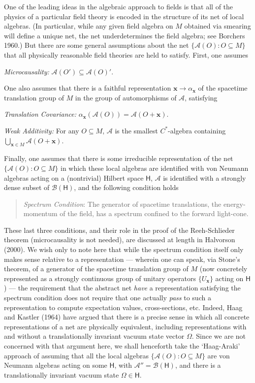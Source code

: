 \documentclass[12pt]{article}
\newcommand{\alg}[1]{\mbox{$\mathcal{#1}$}}
\newcommand{\hil}[1]{\mbox{$\mathsf{#1}$}}
\begin{document}
  One of the leading ideas in the algebraic approach to fields is that 
  all of the 
  physics of a particular field theory is encoded in the structure of 
  its net of local algebras.  (In particular, while any given field 
  algebra on $M$ obtained via smearing will define 
  a unique net, the net underdetermines the field algebra; see 
  Borchers 1960.) 
  But there are some
   general assumptions about the net $\{\alg{A}(O):O\subseteq M\}$ 
  that all physically reasonable 
  field theories are held
   to satisfy.  
  First, one assumes    
    \begin{center} 
\emph{Microcausality:}  $\alg{A}(O')\subseteq \alg{A}(O)'$.   
\end{center}
One also assumes
 that there is a
faithful representation $\mathbf{x}\rightarrow \alpha _{\mathbf{x}}$ of
the spacetime translation group of
$M$ in the group of automorphisms of $\alg{A}$, satisfying 
\begin{center} 
\emph{Translation Covariance:}  $\alpha
_{\mathbf{x}}(\alg{A}(O))=\alg{A}(O+\mathbf{x})$.
\end{center}
\begin{center}  
\emph{Weak Additivity:} For any $O\subseteq M$, $\alg{A}$ is the
smallest
$C^{*}$-algebra containing $\bigcup _{\mathbf{x}\in M}\alg{A}(O+\mathbf{x})$.
\end{center}
Finally, one assumes that there is some irreducible representation of the net 
$\{\alg{A}(O):O\subseteq M\}$ in which these local algebras are 
identified with 
von Neumann algebras acting on a (nontrivial) Hilbert space $\hil{H}$, $\alg{A}$ 
is identified with a strongly dense subset of $\alg{B}(\hil{H})$, and the following condition 
holds 
\begin{quote}
\emph{Spectrum 
Condition}: The generator of spacetime translations, the 
energy-momentum of the field, has a spectrum confined to the forward 
light-cone.
\end{quote}
These last three conditions, and their role in the proof of the 
Reeh-Schlieder theorem (microcausality is not needed), 
are discussed at length in Halvorson (2000).  
We wish only to note here that while the spectrum condition itself 
only makes sense relative to a representation --- wherein one can speak, 
via Stone's theorem, of a generator of the spacetime translation 
group of $M$ (now concretely represented as a strongly continuous group of unitary 
operators $\{U_{\mathbf{x}}\}$ acting on $\hil{H}$) --- the requirement that the abstract net 
\emph{have} a representation satisfying the spectrum condition does 
not require that one actually \emph{pass} to such a representation to compute 
expectation values, cross-sections, etc.  Indeed, Haag and Kastler 
(1964) have argued that there is a precise sense in which all concrete 
representations of a net 
are physically equivalent, including representations 
with and without a translationally invariant vacuum state vector 
$\Omega$.  Since we are not concerned with 
that argument here, we shall henceforth take the `Haag-Araki' approach 
of assuming that all the local algebras $\{\alg{A}(O):O\subseteq M\}$
 are von Neumann algebras 
acting on some $\hil{H}$, with $\alg{A}''=\alg{B}(\hil{H})$, and there 
is 
a translationally invariant vacuum 
state $\Omega\in\hil{H}$.    
\end{document}
